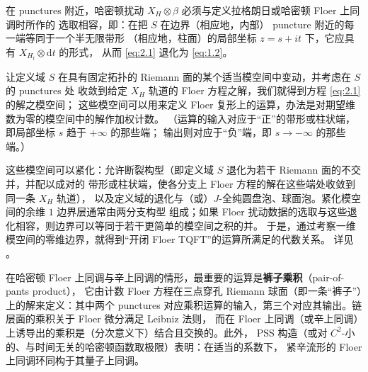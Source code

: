 \documentclass[UTF8,a4paper,11pt,fontset=windows]{ctexart}
\theoremstyle{cnthm}
\numberwithin{equation}{section}
\begin{document}
在 punctures 附近，哈密顿扰动 $X_H\otimes\beta$ 必须与定义拉格朗日或哈密顿 Floer 上同调时所作的
选取相容，即：在把 $S$ 在边界（相应地，内部） puncture 附近的每一端等同于一个半无限带形
（相应地，柱面）的局部坐标 $z=s+it$ 下，它应具有 $X_{H_t}\otimes\mathrm{d}t$ 的形式，
从而 \eqref{eq:2.1} 退化为 \eqref{eq:1.2}。

让定义域 $S$ 在具有固定拓扑的 Riemann 面的某个适当模空间中变动，并考虑在 $S$ 的 punctures 处
收敛到给定 $X_H$ 轨道的 Floer 方程之解，我们就得到方程 \eqref{eq:2.1} 的解之模空间；
这些模空间可以用来定义 Floer 复形上的运算，办法是对期望维数为零的模空间中的解作加权计数。
（运算的输入对应于“正”的带形或柱状端，即局部坐标 $s$ 趋于 $+\infty$ 的那些端；
输出则对应于“负”端，即 $s\to-\infty$ 的那些端。）


这些模空间可以紧化：允许断裂构型（即定义域 $S$ 退化为若干 Riemann 面的不交并，并配以成对的
带形或柱状端，使各分支上 Floer 方程的解在这些端处收敛到同一条 $X_H$ 轨道），
以及定义域的退化与（或）$J$-全纯圆盘泡、球面泡。紧化模空间的余维 $1$ 边界层通常由两分支构型
组成；如果 Floer 扰动数据的选取与这些退化相容，则边界可以等同于若干更简单的模空间之积的并。
于是，通过考察一维模空间的零维边界，就得到“开闭 Floer TQFT”的运算所满足的代数关系。
详见 \cite[第 8 章]{r92}。

在哈密顿 Floer 上同调与辛上同调的情形，最重要的运算是\textbf{裤子乘积}（pair-of-pants product），
它由计数 Floer 方程在三点穿孔 Riemann 球面（即一条“裤子”）上的解来定义：其中两个 punctures
对应乘积运算的输入，第三个对应其输出。链层面的乘积关于 Floer 微分满足 Leibniz 法则，
而在 Floer 上同调（或辛上同调）上诱导出的乘积是（分次意义下）结合且交换的。此外，
PSS 构造（或对 $C^{2}$-小的、与时间无关的哈密顿函数取极限）表明：在适当的系数下，
紧辛流形的 Floer 上同调环同构于其量子上同调。
\end{document}
